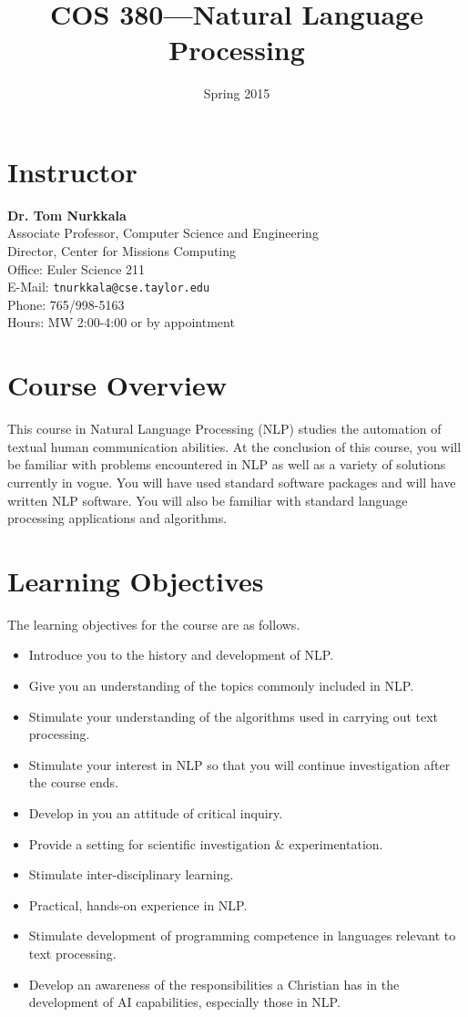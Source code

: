 \documentclass{article}
\date{Spring 2015}
\title{COS 380---Natural Language Processing}
\renewcommand\maketitle\relax
\begin{document}
\maketitle

\section{Instructor}
\label{sec-1}
\textbf{Dr. Tom Nurkkala}\\
Associate Professor, Computer Science and Engineering\\
Director, Center for Missions Computing\\
Office: Euler Science 211\\
E-Mail: \texttt{tnurkkala@cse.taylor.edu}\\
Phone: 765/998-5163\\
Hours: MW 2:00-4:00 or by appointment\\
\section{Course Overview}
\label{sec-2}
This course in Natural Language Processing (NLP) studies the automation of textual human
communication abilities. At the conclusion of this course, you will be familiar with
problems encountered in NLP as well as a variety of solutions currently in vogue. You will
have used standard software packages and will have written NLP software. You will also be
familiar with standard language processing applications and algorithms.
\section{Learning Objectives}
\label{sec-3}
The learning objectives for the course are as follows.
\begin{itemize}
\item Introduce you to the history and development of NLP.
\item Give you an understanding of the topics commonly included in NLP.
\item Stimulate your understanding of the algorithms used in carrying out text processing.
\item Stimulate your interest in NLP so that you will continue investigation after the course ends.
\item Develop in you an attitude of critical inquiry.
\item Provide a setting for scientific investigation \& experimentation.
\item Stimulate inter-disciplinary learning.
\item Practical, hands-on experience in NLP.
\item Stimulate development of programming competence in languages relevant to text processing.
\item Develop an awareness of the responsibilities a Christian has in the development of AI
capabilities, especially those in NLP.
\end{itemize}
\end{document}
